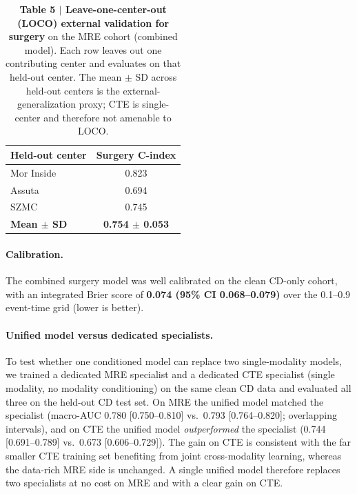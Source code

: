 \documentclass[11pt]{article}
\begin{document}
\begin{table}[htbp]
\centering
\caption{\textbf{Table 5 $\vert$ Leave-one-center-out (LOCO) external validation for surgery}
on the MRE cohort (combined model). Each row leaves out one contributing center and evaluates on
that held-out center. The mean $\pm$ SD across held-out centers is the external-generalization proxy;
CTE is single-center and therefore not amenable to LOCO.}
\label{tab:loco}
\small
\begin{tabular}{@{}lc@{}}
\toprule
\textbf{Held-out center} & \textbf{Surgery C-index} \\
\midrule
Mor Inside & 0.823 \\
Assuta     & 0.694 \\
SZMC       & 0.745 \\
\midrule
\textbf{Mean $\pm$ SD} & \textbf{0.754 $\pm$ 0.053} \\
\bottomrule
\end{tabular}
\end{table}

\paragraph{Calibration.}
The combined surgery model was well calibrated on the clean CD-only cohort, with an integrated Brier
score of \textbf{0.074 (95\% CI 0.068--0.079)} over the 0.1--0.9 event-time grid (lower is better).

\paragraph{Unified model versus dedicated specialists.}
To test whether one conditioned model can replace two single-modality models, we trained a dedicated
MRE specialist and a dedicated CTE specialist (single modality, no modality conditioning) on the same
clean CD data and evaluated all three on the held-out CD test set. On MRE the unified model matched the
specialist (macro-AUC 0.780 [0.750--0.810] vs.\ 0.793 [0.764--0.820]; overlapping intervals), and on
CTE the unified model \emph{outperformed} the specialist (0.744 [0.691--0.789] vs.\ 0.673 [0.606--0.729]).
The gain on CTE is consistent with the far smaller CTE training set benefiting from joint cross-modality
learning, whereas the data-rich MRE side is unchanged. A single unified model therefore replaces two
specialists at no cost on MRE and with a clear gain on CTE.
\end{document}

